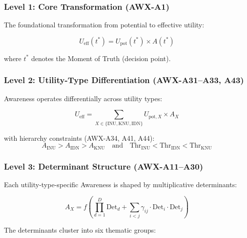 \subsubsection{Level 1: Core Transformation (AWX-A1)}

The foundational transformation from potential to effective utility:

\begin{equation}
U_{\text{eff}}(t^*) = U_{\text{pot}}(t^*) \times A(t^*)
\label{eq:core-transform}
\end{equation}

where $t^*$ denotes the Moment of Truth (decision point).

\subsubsection{Level 2: Utility-Type Differentiation (AWX-A31--A33, A43)}

Awareness operates differentially across utility types:

\begin{equation}
U_{\text{eff}} = \sum_{X \in \{\text{INU}, \text{KNU}, \text{IDN}\}} U_{\text{pot},X} \times A_X
\label{eq:utility-types}
\end{equation}

with hierarchy constraints (AWX-A34, A41, A44):
\begin{equation}
A_{\text{INU}} > A_{\text{IDN}} > A_{\text{KNU}} \quad \text{and} \quad \text{Thr}_{\text{INU}} < \text{Thr}_{\text{IDN}} < \text{Thr}_{\text{KNU}}
\end{equation}

\subsubsection{Level 3: Determinant Structure (AWX-A11--A30)}

Each utility-type-specific Awareness is shaped by multiplicative determinants:

\begin{equation}
A_X = f\left(\prod_{d=1}^{D} \text{Det}_d + \sum_{i<j} \gamma_{ij} \cdot \text{Det}_i \cdot \text{Det}_j\right)
\label{eq:determinants}
\end{equation}

The determinants cluster into six thematic groups:

